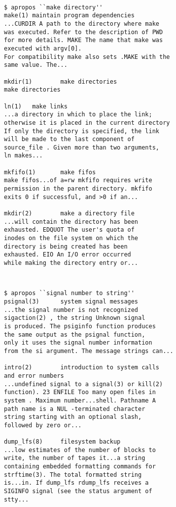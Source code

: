 \documentclass[letterpaper,twocolumn,10pt]{article}
\begin{document}
{\tt \small
{}
\begin{lstlisting}
$ apropos ``make directory''
make(1) maintain program dependencies
...CURDIR A path to the directory where make
was executed. Refer to the description of PWD
for more details. MAKE The name that make was
executed with argv[0].
For compatibility make also sets .MAKE with the
same value. The...

mkdir(1)        make directories
make directories

ln(1)   make links
...a directory in which to place the link;
otherwise it is placed in the current directory
If only the directory is specified, the link
will be made to the last component of
source_file . Given more than two arguments,
ln makes...

mkfifo(1)       make fifos
make fifos...of a=rw mkfifo requires write
permission in the parent directory. mkfifo
exits 0 if successful, and >0 if an...

mkdir(2)        make a directory file
...will contain the directory has been
exhausted. EDQUOT The user's quota of
inodes on the file system on which the
directory is being created has been
exhausted. EIO An I/O error occurred
while making the directory entry or...
\end{lstlisting}
}

{\tt \small
{}
\begin{lstlisting}
$ apropos ``signal number to string''
psignal(3)      system signal messages
...the signal number is not recognized
sigaction(2) , the string Unknown signal
is produced. The psiginfo function produces
the same output as the psignal function,
only it uses the signal number information
from the si argument. The message strings can...

intro(2)        introduction to system calls
and error numbers
...undefined signal to a signal(3) or kill(2)
function). 23 ENFILE Too many open files in
system . Maximum number...shell. Pathname A
path name is a NUL -terminated character
string starting with an optional slash,
followed by zero or...

dump_lfs(8)     filesystem backup
...low estimates of the number of blocks to
write, the number of tapes it...a string
containing embedded formatting commands for
strftime(3). The total formatted string
is...in. If dump_lfs rdump_lfs receives a
SIGINFO signal (see the status argument of
stty...
\end{lstlisting}
}
\end{document}
